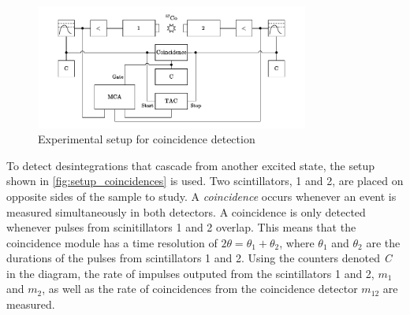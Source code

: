 \begin{figure}[h]
    \centering
    \includegraphics[width=0.8\textwidth]{figures/coincidence_schematic.pdf}
    \caption{Experimental setup for coincidence detection \cite{notice_VI}}
    \label{fig:setup_coincidences}
\end{figure}
To detect desintegrations that cascade from another excited state, the setup shown in \hbox{\autoref{fig:setup_coincidences}} is used. 
Two scintillators, 1 and 2, are placed on opposite sides of the sample to study.
A \emph{coincidence} occurs whenever an event is measured simultaneously in both detectors. A coincidence is only detected whenever pulses from scinitillators 1 and 2 overlap. This means that the coincidence module has a time resolution of \(2 \theta = \theta_1 + \theta_2\), where \(\theta_1\) and \(\theta_2\) are the durations of the pulses from scintillators 1 and 2.
Using the counters denoted \emph{C} in the diagram, the rate of impulses outputed from the scintillators 1 and 2, \(m_1\) and \(m_2\), as well as the rate of coincidences from the coincidence detector \(m_{12}\) are measured. %

